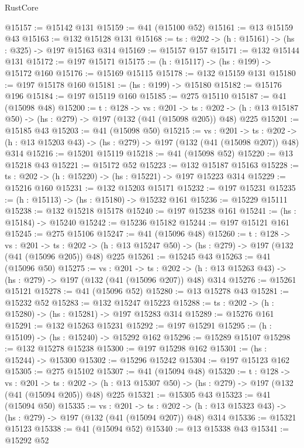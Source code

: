 \begin{lexlean}{RustCore}
\begin{coremodule}
@15157 := @15142 @131
@15159 := @41 (@15100 @52)
@15161 := @13 @15159 @43
@15163 := @132 @15128 @131
@15168 := {ts : @202} -> (h : @15161) -> (hs : @325) -> @197 @15163 @314
@15169 := @15157 @157
@15171 := @132 @15144 @131
@15172 := @197 @15171
@15175 := (h : @15117) -> (hs : @199) -> @15172 @160
@15176 := @15169 @15115
@15178 := @132 @15159 @131
@15180 := @197 @15178 @160
@15181 := (hs : @199) -> @15180
@15182 := @15176 @196
@15184 := @197 @15119 @160
@15185 := @275 @15110
@15187 := @41 (@15098 @48)
@15200 := {t : @128} ->
  {vs : @201} ->
  {ts : @202} -> (h : @13 @15187 @50) -> (hs : @279) -> @197 (@132 (@41 (@15098 @205)) @48) @225
@15201 := @15185 @43
@15203 := @41 (@15098 @50)
@15215 := {vs : @201} ->
  {ts : @202} -> (h : @13 @15203 @43) -> (hs : @279) -> @197 (@132 (@41 (@15098 @207)) @48) @314
@15216 := @15201 @15119
@15218 := @41 (@15098 @52)
@15220 := @13 @15218 @43
@15221 := @15172 @52
@15223 := @132 @15187 @15163
@15228 := {ts : @202} -> (h : @15220) -> (hs : @15221) -> @197 @15223 @314
@15229 := @15216 @160
@15231 := @132 @15203 @15171
@15232 := @197 @15231
@15235 := (h : @15113) -> (hs : @15180) -> @15232 @161
@15236 := @15229 @15111
@15238 := @132 @15218 @15178
@15240 := @197 @15238 @161
@15241 := (hs : @15184) -> @15240
@15242 := @15236 @15182
@15244 := @197 @15121 @161
@15245 := @275 @15106
@15247 := @41 (@15096 @48)
@15260 := {t : @128} ->
  {vs : @201} ->
  {ts : @202} -> (h : @13 @15247 @50) -> (hs : @279) -> @197 (@132 (@41 (@15096 @205)) @48) @225
@15261 := @15245 @43
@15263 := @41 (@15096 @50)
@15275 := {vs : @201} ->
  {ts : @202} -> (h : @13 @15263 @43) -> (hs : @279) -> @197 (@132 (@41 (@15096 @207)) @48) @314
@15276 := @15261 @15121
@15278 := @41 (@15096 @52)
@15280 := @13 @15278 @43
@15281 := @15232 @52
@15283 := @132 @15247 @15223
@15288 := {ts : @202} -> (h : @15280) -> (hs : @15281) -> @197 @15283 @314
@15289 := @15276 @161
@15291 := @132 @15263 @15231
@15292 := @197 @15291
@15295 := (h : @15109) -> (hs : @15240) -> @15292 @162
@15296 := @15289 @15107
@15298 := @132 @15278 @15238
@15300 := @197 @15298 @162
@15301 := (hs : @15244) -> @15300
@15302 := @15296 @15242
@15304 := @197 @15123 @162
@15305 := @275 @15102
@15307 := @41 (@15094 @48)
@15320 := {t : @128} ->
  {vs : @201} ->
  {ts : @202} -> (h : @13 @15307 @50) -> (hs : @279) -> @197 (@132 (@41 (@15094 @205)) @48) @225
@15321 := @15305 @43
@15323 := @41 (@15094 @50)
@15335 := {vs : @201} ->
  {ts : @202} -> (h : @13 @15323 @43) -> (hs : @279) -> @197 (@132 (@41 (@15094 @207)) @48) @314
@15336 := @15321 @15123
@15338 := @41 (@15094 @52)
@15340 := @13 @15338 @43
@15341 := @15292 @52

\end{coremodule}
\end{lexlean}
